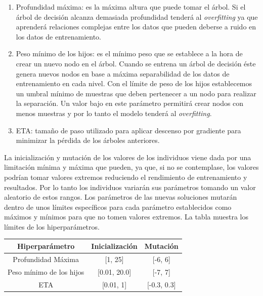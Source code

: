 \begin{enumerate}
            \begin{enumerate}

                \item Profundidad máxima: es la máxima altura que puede tomar el árbol. Si el árbol de decisión alcanza demasiada profundidad tenderá al \textit{overfitting} ya que aprenderá relaciones complejas entre los datos que pueden deberse a ruido en los datos de entrenamiento.

                \item Peso mínimo de los hijos: es el mínimo peso que se establece a la hora de crear un nuevo nodo en el árbol. Cuando se entrena un árbol de decisión éste genera nuevos nodos en base a máxima separabilidad de los datos de entrenamiento en cada nivel. Con el límite de peso de los hijos establecemos un umbral mínimo de muestras que deben pertenecer a un nodo para realizar la separación. Un valor bajo en este parámetro permitirá crear nodos con menos muestras y por lo tanto el modelo tenderá al \textit{overfitting}.

                \item ETA: tamaño de paso utilizado para aplicar descenso por gradiente para minimizar la pérdida de los árboles anteriores.

            \end{enumerate}

            La inicialización y mutación de los valores de los individuos viene dada por una limitación mínima y máxima que pueden, ya que, si no se contemplase, los valores podrían tomar valores extremos reduciendo el rendimiento de entrenamiento y resultados. Por lo tanto los individuos variarán sus parámetros tomando un valor aleatorio de estos rangos.  Los parámetros de las nuevas soluciones mutarán dentro de unos límites específicos para cada parámetro establecidos como máximos y mínimos para que no tomen valores extremos. La tabla \cite{InitAndMutationLimitsHyperparamsTable} muestra los límites de los hiperparámetros.

            \begin{table}[H]
                \centering
                    \begin{tabular}{ |c|c|c| } 
                    \hline
                    \textbf{Hiperparámetro} & \textbf{Inicialización} & \textbf{Mutación}\\
                    \hline
                        Profundidad Máxima & [1, 25] & [-6, 6]\\ 
                        Peso mínimo de los hijos & [0.01, 20.0] & [-7, 7] \\ 
                        ETA & [0.01, 1] &  [-0.3, 0.3] \\ 
                    \hline


\end{tabular}
\end{table}
\end{enumerate}
